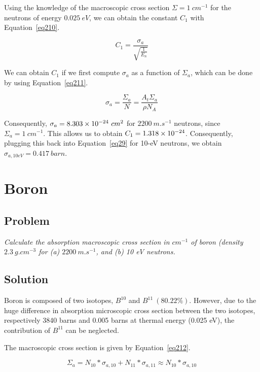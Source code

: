 Using the knowledge of the macroscopic cross section $\Sigma = 1\ cm^{-1}$ for the neutrons of energy $0.025\ eV$, we can obtain the constant $C_1$ with Equation~\ref{eq210}.

\begin{equation}\label{eq210}
C_1 = \frac{\sigma_a}{\sqrt{\frac{1}{E_n}}}
\end{equation}

We can obtain $C_1$ if we first compute $\sigma_a$ as a function of $\Sigma_a$, which can be done by using Equation~\ref{eq211}.

\begin{equation}\label{eq211}
\sigma_a = \frac{\Sigma_a}{N} = \frac{A_t\Sigma_a}{\rho N_A}
\end{equation}

Consequently, $\sigma_a = \text{\num{8.303e-24}}\ cm^2$ for $2200\ m.s^{-1}$ neutrons, since $\Sigma_a = 1\ cm^{-1}$. This allows us to obtain $C_1 = \text{\num{1.318e-24}}$. Consequently, plugging this back into Equation~\ref{eq29} for 10-eV neutrons, we obtain $\sigma_{a, 10eV} = 0.417\ barn$.

\section{Boron}
\label{prob23}

\subsection{Problem}
\textit{Calculate the absorption macroscopic cross section in $cm^{-1}$ of boron (density $2.3\ g.cm^{-3}$ for (a) $2200\ m.s^{-1}$, and (b) 10 eV neutrons.}

\subsection{Solution}

Boron is composed of two isotopes, $B^{10}$ and $B^{11}\ (80.22\%)$. However, due to the huge difference in absorption microscopic cross section between the two isotopes, respectively 3840 barns and 0.005 barns at thermal energy (0.025 eV), the contribution of $B^{11}$ can be neglected.

The macroscopic cross section is given by Equation~\ref{eq212}.


\begin{equation}\label{eq212}
\Sigma_a = N_{10} * \sigma_{a, 10} + N_{11} * \sigma_{a, 11} \approx N_{10} * \sigma_{a, 10}
\end{equation}

